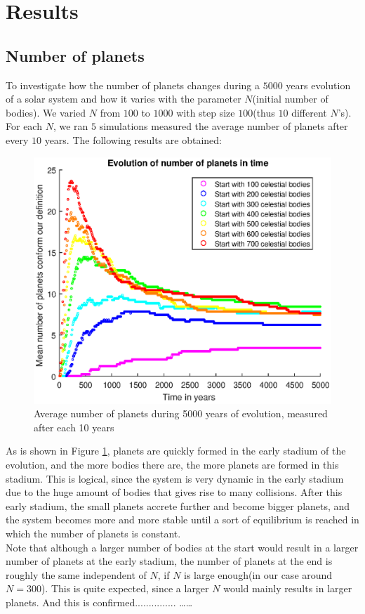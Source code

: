 \section{Results}

\subsection{Number of planets}
To investigate how the number of planets changes during a $5000$ years evolution of a solar system and how it varies with the parameter $N$(initial number of bodies). 
We varied $N$ from $100$ to $1000$ with step size $100$(thus $10$ different $N$'s). 
For each $N$, we ran $5$ simulations measured the average number of planets after every $10$ years. The following results are obtained:

\begin{figure}[H]
\centering
\includegraphics[scale=0.8]{AantPlaneten.eps}
\caption{Average number of planets during 5000 years of evolution, measured after each 10 years}
    \label{fig:AantPlaneten}
\end{figure}

As is shown in Figure \ref{fig:AantPlaneten}, planets are quickly formed in the early stadium of the evolution, and the more bodies there are, the more planets are formed in this stadium. 
This is logical, since the system is very dynamic in the early stadium due to the huge amount of bodies that gives rise to many collisions. 
After this early stadium, the small planets accrete further and become bigger planets, and the system becomes more and more stable until a sort of equilibrium is reached in which the number of planets is constant.\\

Note that although a larger number of bodies at the start would result in a larger number of planets at the early stadium, the number of planets at the end is roughly the same independent of $N$, if $N$ is large enough(in our case around $N=300$). 
This is quite expected, since a larger $N$ would mainly results in larger planets. And this is confirmed............... \dots \dots

